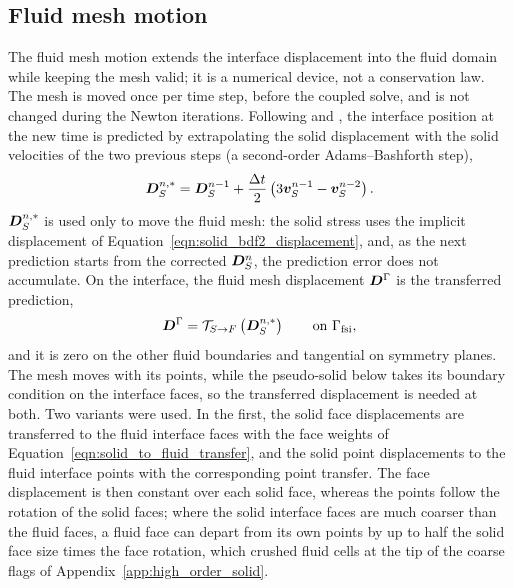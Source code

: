 \subsection{Fluid mesh motion}
\label{sec:fluid_mesh_motion}

The fluid mesh motion extends the interface displacement into the fluid domain while keeping the mesh valid; it is a numerical device, not a conservation law.
The mesh is moved once per time step, before the coupled solve, and is not changed during the Newton iterations.
Following \citet{Liu2014} and \citet[Algorithm~2]{JaimanJoshi2022}, the interface position at the new time is predicted by extrapolating the solid displacement with the solid velocities of the two previous steps (a second-order Adams--Bashforth step),
\begin{equation}
    \boldsymbol{D}_S^{n,*}
    =
    \boldsymbol{D}_S^{n-1}
    +
    \frac{\Delta t}{2}
    \left(
    3\boldsymbol{v}_S^{n-1}
    -
    \boldsymbol{v}_S^{n-2}
    \right).
    \label{eqn:solid_predicted_displacement}
\end{equation}
$\boldsymbol{D}_S^{n,*}$ is used only to move the fluid mesh: the solid stress uses the implicit displacement of Equation~\eqref{eqn:solid_bdf2_displacement}, and, as the next prediction starts from the corrected $\boldsymbol{D}_S^{n}$, the prediction error does not accumulate.
On the interface, the fluid mesh displacement $\boldsymbol{D}^{\Gamma}$ is the transferred prediction,
\begin{equation}
    \boldsymbol{D}^{\Gamma}
    =
    \mathcal{T}_{S\to F}\left(\boldsymbol{D}_S^{n,*}\right)
    \qquad
    \text{on } \Gamma_\mathrm{fsi},
    \label{eqn:mesh_displacement_interface}
\end{equation}
and it is zero on the other fluid boundaries and tangential on symmetry planes.
The mesh moves with its points, while the pseudo-solid below takes its boundary condition on the interface faces, so the transferred displacement is needed at both.
Two variants were used.
In the first, the solid face displacements are transferred to the fluid interface faces with the face weights of Equation~\eqref{eqn:solid_to_fluid_transfer}, and the solid point displacements to the fluid interface points with the corresponding point transfer.
The face displacement is then constant over each solid face, whereas the points follow the rotation of the solid faces; where the solid interface faces are much coarser than the fluid faces, a fluid face can depart from its own points by up to half the solid face size times the face rotation, which crushed fluid cells at the tip of the coarse flags of Appendix~\ref{app:high_order_solid}.
